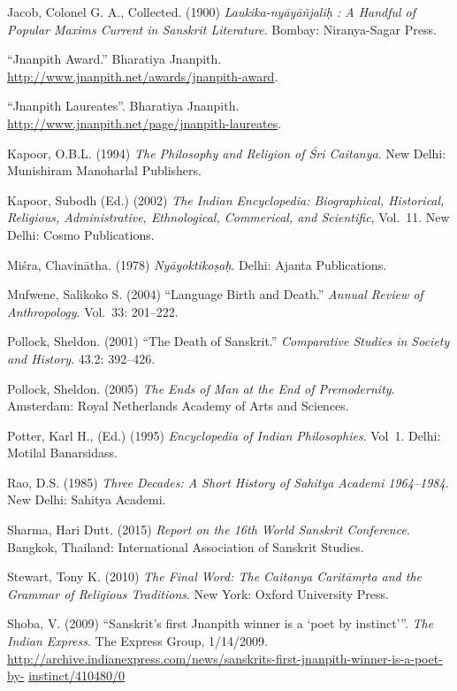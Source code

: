 \begin{thebibliography}{99}
Jacob, Colonel G. A., Collected. (1900) {\sl Laukika-nyāyāñjaliḥ : A Handful of Popular Maxims Current in Sanskrit Literature}. Bombay: Niranya-Sagar Press. 

“Jnanpith Award.” Bharatiya Jnanpith. \url{http://www.jnanpith.net/awards/jnanpith-award}.

“Jnanpith Laureates”. Bharatiya Jnanpith. \url{http://www.jnanpith.net/page/jnanpith-laureates}. 

Kapoor, O.B.L. (1994) {\sl The Philosophy and Religion of Śri Caitanya}. New Delhi: Munishiram Manoharlal Publishers. 

Kapoor, Subodh (Ed.) (2002) {\sl The Indian Encyclopedia: Biographical, Historical, Religious, 
Administrative, Ethnological, Commerical, and Scientific}, Vol.~11. New Delhi: Cosmo Publications. 

Miśra, Chavinātha. (1978) {\sl Nyāyoktikoṣaḥ}. Delhi: Ajanta Publications. 

Mufwene, Salikoko S. (2004) “Language Birth and Death.” {\sl Annual Review of Anthropology}. Vol.~33: 201--222. 

Pollock, Sheldon. (2001) “The Death of Sanskrit.” {\sl Comparative Studies in Society and History}. 43.2: 392--426. 

Pollock, Sheldon. (2005) {\sl The Ends of Man at the End of Premodernity}. Amsterdam: Royal Netherlands Academy of Arts and Sciences. 

Potter, Karl H., (Ed.) (1995) {\sl Encyclopedia of Indian Philosophies}. Vol~1. Delhi: Motilal Banarsidass. 

Rao, D.S. (1985) {\sl Three Decades: A Short History of Sahitya Academi 1964--1984}. New Delhi: Sahitya Academi. 

Sharma, Hari Dutt. (2015) {\sl Report on the 16th World Sanskrit Conference}. Bangkok, Thailand: International Association of Sanskrit Studies. 

Stewart, Tony K. (2010) {\sl The Final Word: The Caitanya Caritāmṛta and the Grammar of Religious Traditions}. New York: Oxford University Press. 

Shoba, V. (2009) “Sanskrit’s first Jnanpith winner is a ‘poet by instinct’”. {\sl The Indian Express}. The Express Group, 1/14/2009. 
{\fontsize{11}{13}\selectfont\url{http://archive.indianexpress.com/news/sanskrits-first-jnanpith-winner-is-a-poet-by-} \url{instinct/410480/0}}

\end{thebibliography}

\theendnotes
